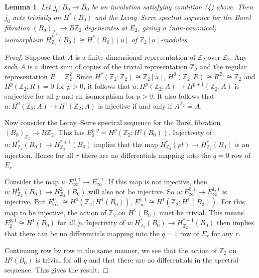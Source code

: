 \documentclass{amsart}
\newtheorem{lemma}[theorem]{Lemma}
\theoremstyle{definition}
\theoremstyle{remark}
\numberwithin{equation}{section}
\begin{document}
\begin{lemma}\label{lem:degen}
Let $j_0 : B_0 \to B_0$ be an involution satisfying condition (4) above. Then $j_0$ acts trivially on $H^*(B_0)$ and the Leray--Serre spectral sequence for the Borel fibration $(B_0)_{\mathbb{Z}_2} \to B\mathbb{Z}_2$ degenerates at $E_2$, giving a (non-canonical) isomorphism $H^*_{\mathbb{Z}_2}(B_0) \cong H^*(B_0)[u]$ of $\mathbb{Z}_2[u]$-modules.
\end{lemma}
\begin{proof}
Suppose that $A$ is a finite dimensional representation of $\mathbb{Z}_2$ over $\mathbb{Z}_2$. Any such $A$ is a direct sum of copies of the trivial representation $\mathbb{Z}_2$ and the regular representation $R = \mathbb{Z}_2^2$. Since $H^*( \mathbb{Z}_2 ; \mathbb{Z}_2) \cong \mathbb{Z}_2[u]$, $H^0( \mathbb{Z}_2 ; R) \cong R^{\mathbb{Z}_2} \cong \mathbb{Z}_2$ and $H^p( \mathbb{Z}_2 ; R) = 0$ for $p>0$, it follows that $u : H^p( \mathbb{Z}_2 ; A) \to H^{p+1}( \mathbb{Z}_2 ; A)$ is surjective for all $p$ and an isomorphism for $p > 0$. It also follows that $u : H^0( \mathbb{Z}_2 ; A) \to H^1(\mathbb{Z}_2 ; A)$ is injective if and only if $A^{\mathbb{Z}_2} = A$.

Now consider the Leray--Serre spectral sequence for the Borel fibration $(B_0)_{\mathbb{Z}_2} \to B\mathbb{Z}_2$. This has $E^{p,q}_2 = H^p( \mathbb{Z}_2 ; H^q(B_0) )$. Injectivity of $u : H^*_{\mathbb{Z}_2}(B_0) \to H^{*+1}_{\mathbb{Z}_2}(B_0)$ implies that the map $H^*_{\mathbb{Z}_2}(pt) \to H^*_{\mathbb{Z}_2}(B_0)$ is an injection. Hence for all $r$ there are no differentials mapping into the $q=0$ row of $E_r$.

Consider the map $u : E_\infty^{0,1} \to E_\infty^{1,1}$. If this map is not injective, then $u : H^1_{\mathbb{Z}_2}(B_0) \to H^2_{\mathbb{Z}_2}(B_0)$ will also not be injective. So $u : E_\infty^{0,1} \to E_\infty^{1,1}$ is injective. But $E_\infty^{0,1} \cong H^0( \mathbb{Z}_2 ; H^1(B_0))$, $E_\infty^{1,1} \cong H^1( \mathbb{Z}_2 ; H^1(B_0))$. For this map to be injective, the action of $\mathbb{Z}_2$ on $H^1(B_0)$ must be trivial. This means $E_2^{p,1} \cong H^1(B_0)$ for all $p$. Injectivity of $u : H^*_{\mathbb{Z}_2}(B_0) \to H^{*+1}_{\mathbb{Z}_2}(B_0)$ then implies that there can be no differentials mapping into the $q=1$ row of $E_r$ for any $r$.

Continuing row by row in the same manner, we see that the action of $\mathbb{Z}_2$ on $H^q(B_0)$ is trivial for all $q$ and that there are no differentials in the spectral sequence. This gives the result.
\end{proof}
\end{document}
